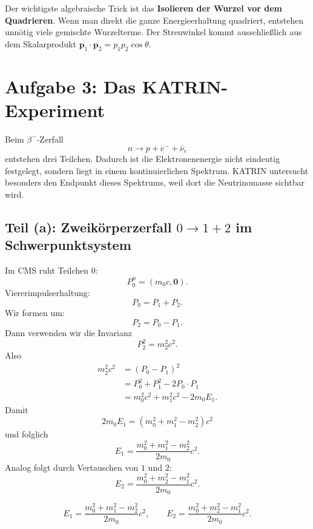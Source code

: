\documentclass[11pt,a4paper]{scrartcl}
\newcommand{\paren}[1]{\left( #1 \right)}
\newcommand{\vect}[1]{\bm{#1}}
\theoremstyle{definition}
\theoremstyle{plain}
\theoremstyle{remark}
\begin{document}
\begin{learnbox}
Der wichtigste algebraische Trick ist das \textbf{Isolieren der Wurzel vor dem Quadrieren}. Wenn man direkt die ganze Energieerhaltung quadriert, entstehen unnötig viele gemischte Wurzelterme. Der Streuwinkel kommt ausschließlich aus dem Skalarprodukt $\vect p_1\cdot\vect p_2=p_1p_2\cos\theta$.
\end{learnbox}

\FloatBarrier
\newpage

\section{Aufgabe 3: Das KATRIN-Experiment}

\begin{taskbox}
Beim $\beta^-$-Zerfall
\[
    n\longrightarrow p+e^-+\bar\nu_e
\]
entstehen drei Teilchen. Dadurch ist die Elektronenenergie nicht eindeutig festgelegt, sondern liegt in einem kontinuierlichen Spektrum. KATRIN untersucht besonders den Endpunkt dieses Spektrums, weil dort die Neutrinomasse sichtbar wird.
\end{taskbox}

\subsection{Teil (a): Zweikörperzerfall $0\to 1+2$ im Schwerpunktsystem}

\begin{calculationbox}
Im CMS ruht Teilchen $0$:
\[
    P_0^\mu=\paren{m_0c,\vect 0}.
\]
Viererimpulserhaltung:
\[
    P_0=P_1+P_2.
\]
Wir formen um:
\[
    P_2=P_0-P_1.
\]
Dann verwenden wir die Invarianz
\[
    P_2^2=m_2^2c^2.
\]
Also
\begin{align*}
    m_2^2c^2
    &= (P_0-P_1)^2 \\
    &= P_0^2+P_1^2-2P_0\cdot P_1 \\
    &= m_0^2c^2+m_1^2c^2-2m_0E_1.
\end{align*}
Damit
\[
    2m_0E_1=(m_0^2+m_1^2-m_2^2)c^2
\]
und folglich
\[
    E_1=\frac{m_0^2+m_1^2-m_2^2}{2m_0}c^2.
\]
Analog folgt durch Vertauschen von $1$ und $2$:
\[
    E_2=\frac{m_0^2+m_2^2-m_1^2}{2m_0}c^2.
\]
\end{calculationbox}

\begin{answerbox}
\[
    \boxed{E_1=\frac{m_0^2+m_1^2-m_2^2}{2m_0}c^2,
    \qquad
    E_2=\frac{m_0^2+m_2^2-m_1^2}{2m_0}c^2.}
\]
\end{answerbox}
\end{document}
